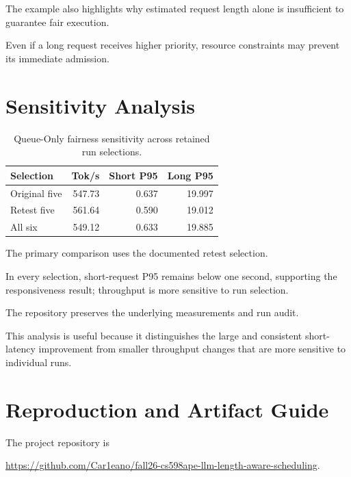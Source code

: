 \documentclass[sigplan,nonacm]{acmart}
\begin{document}
The example also highlights why estimated
request length alone is insufficient
to guarantee fair execution.

Even if a long request receives higher
priority, resource constraints may prevent
its immediate admission.


\section{Sensitivity Analysis}
\label{app:sensitivity}

\begin{table}[h]
\centering
\caption{
Queue-Only fairness sensitivity
across retained run selections.
}
\scriptsize
\begin{tabular}{lrrr}
\toprule
Selection & Tok/s & Short P95 & Long P95\\
\midrule
Original five & 547.73 & 0.637 & 19.997\\
Retest five & 561.64 & 0.590 & 19.012\\
All six & 549.12 & 0.633 & 19.885\\
\bottomrule
\end{tabular}
\end{table}

The primary comparison uses the documented
retest selection.

In every selection, short-request P95 remains
below one second, supporting the responsiveness
result; throughput is more sensitive
to run selection.

The repository preserves the underlying
measurements and run audit.

This analysis is useful because it distinguishes
the large and consistent short-latency improvement
from smaller throughput changes that are more
sensitive to individual runs.


\section{Reproduction and Artifact Guide}
\label{app:repro}

The project repository is

\url{https://github.com/Car1eano/fall26-cs598ape-llm-length-aware-scheduling}.
\end{document}
